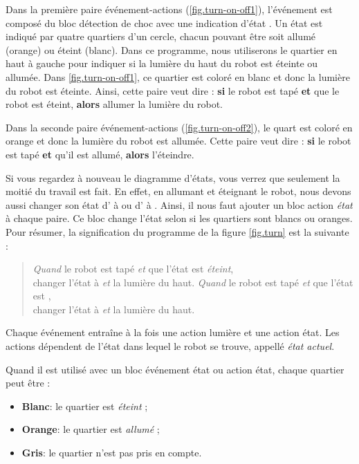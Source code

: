Dans la première paire événement-actions (\cref{fig.turn-on-off1}), l'événement est composé du bloc détection de choc avec une indication d'état .
Un état est indiqué par quatre quartiers d'un cercle, chacun pouvant être soit allumé (orange) ou éteint (blanc).
Dans ce programme, nous utiliserons le quartier en haut à gauche pour indiquer si la lumière du haut du robot est éteinte ou allumée.
Dans \cref{fig.turn-on-off1}, ce quartier est coloré en blanc
et donc la lumière du robot est éteinte.
Ainsi, cette paire veut dire : \textbf{si} le robot est tapé \textbf{et} que le robot est éteint, \textbf{alors} allumer la lumière du robot.

Dans la seconde paire événement-actions
(\cref{fig.turn-on-off2}),
le quart est coloré en orange et donc la lumière du robot est allumée.
Cette paire veut dire : \textbf{si} le robot est tapé \textbf{et} qu'il est allumé, \textbf{alors} l'éteindre.

Si vous regardez à nouveau le diagramme d'états, vous verrez que seulement la moitié du travail est fait.
En effet, en allumant et éteignant le robot, nous devons aussi changer son état d' à  ou d' à .
Ainsi, il nous faut ajouter un bloc action \emph{état}  à chaque paire.
Ce bloc change l'état selon si les quartiers sont blancs ou oranges.
Pour résumer, la signification du programme de la figure \cref{fig.turn} est la suivante :

\begin{quote}
    \emph{Quand} le robot est tapé \emph{et} que l'état est \emph{éteint},\\ changer l'état à  \emph{et}  la lumière du haut.
    \emph{Quand} le robot est tapé \emph{et} que l'état est ,\\changer l'état à 
    \emph{et}  la lumière du haut.
\end{quote}

Chaque événement entraîne à la fois une action lumière et une action état.
Les actions dépendent de l'état dans lequel le robot se trouve, appellé \emph{état actuel}.


Quand il est utilisé avec un bloc événement état ou action état, chaque quartier peut être :
\begin{itemize}
	\item \textbf{Blanc}: le quartier est \emph{éteint} ;
	\item \textbf{Orange}: le quartier est \emph{allumé} ;
	\item \textbf{Gris}: le quartier n'est pas pris en compte.
\end{itemize}

